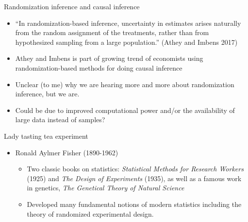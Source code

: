 \documentclass{beamer}
\begin{document}
\begin{frame}{Randomization inference and causal inference}

\begin{itemize}
\item ``In randomization-based inference, uncertainty in estimates arises naturally from the random assignment of the treatments, rather than from hypothesized sampling from a large population.'' (Athey and Imbens 2017)

\item Athey and Imbens is part of growing trend of economists using randomization-based methods for doing causal inference

\item Unclear (to me) why we are hearing more and more about randomization inference, but we are. 

\item Could be due to improved computational power and/or the availability of large data instead of samples?

\end{itemize}


\end{frame}




\begin{frame}{Lady tasting tea experiment}

	\begin{itemize}
	\item Ronald Aylmer Fisher (1890-1962)
		\begin{itemize}
		\item Two classic books on statistics: \emph{Statistical Methods for Research Workers} (1925) and \emph{The Design of Experiments} (1935), as well as a famous work in genetics, \emph{The Genetical Theory of Natural Science}
		\item Developed many fundamental notions of modern statistics including the theory of randomized experimental design.
		\end{itemize}

	\end{itemize}
	
\end{frame}
\end{document}
